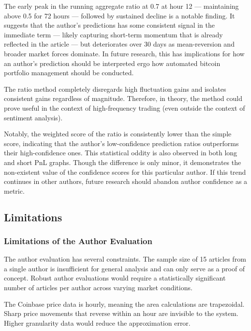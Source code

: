 \documentclass[sigconf,screen]{acmart}
\begin{document}
The early peak in the running aggregate ratio at 0.7 at hour 12 --- maintaining above 0.5 for 72 hours --- followed by sustained decline is a notable finding. It suggests that the author's predictions has some consistent signal in the immediate term --- likely capturing short-term momentum that is already reflected in the article --- but deteriorates over 30 days as mean-reversion and broader market forces dominate. In future research, this has implications for how an author's prediction should be interpreted ergo how automated bitcoin portfolio management should be conducted. 

The ratio method completely disregards high fluctuation gains and isolates consistent gains regardless of magnitude. Therefore, in theory, the method could prove useful in the context of high-frequency trading (even outside the context of sentiment analysis). 

Notably, the weighted score of the ratio is consistently lower than the simple score, indicating that the author's low-confidence prediction ratios outperforms their high-confidence ones. This statistical oddity is also observed in both long and short PnL graphs. Though the difference is only minor, it demonstrates the non-existent value of the confidence scores for this particular author. If this trend continues in other authors, future research should abandon author confidence as a metric.

\subsection{Limitations}

\subsubsection{Limitations of the Author Evaluation}
 
The author evaluation has several constraints. The sample size of 15 articles from a single author is insufficient for general analysis and can only serve as a proof of concept. Robust author evaluations would require a statistically significant number of articles per author across varying market conditions.
  
The Coinbase price data is hourly, meaning the area calculations are trapezoidal. Sharp price movements that reverse within an hour are invisible to the system. Higher granularity data would reduce the approximation error.
 
\end{document}
